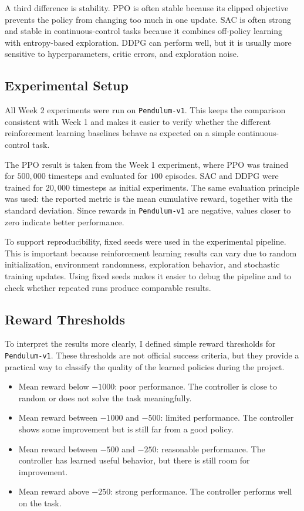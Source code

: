 \documentclass[11pt,a4paper]{article}
\begin{document}
A third difference is stability. PPO is often stable because its clipped objective prevents the policy from changing too much in one update. SAC is often strong and stable in continuous-control tasks because it combines off-policy learning with entropy-based exploration. DDPG can perform well, but it is usually more sensitive to hyperparameters, critic errors, and exploration noise.

\subsection{Experimental Setup}

All Week 2 experiments were run on \texttt{Pendulum-v1}. This keeps the comparison consistent with Week 1 and makes it easier to verify whether the different reinforcement learning baselines behave as expected on a simple continuous-control task.

The PPO result is taken from the Week 1 experiment, where PPO was trained for $500{,}000$ timesteps and evaluated for $100$ episodes. SAC and DDPG were trained for $20{,}000$ timesteps as initial experiments. The same evaluation principle was used: the reported metric is the mean cumulative reward, together with the standard deviation. Since rewards in \texttt{Pendulum-v1} are negative, values closer to zero indicate better performance.

To support reproducibility, fixed seeds were used in the experimental pipeline. This is important because reinforcement learning results can vary due to random initialization, environment randomness, exploration behavior, and stochastic training updates. Using fixed seeds makes it easier to debug the pipeline and to check whether repeated runs produce comparable results.

\subsection{Reward Thresholds}

To interpret the results more clearly, I defined simple reward thresholds for \texttt{Pendulum-v1}. These thresholds are not official success criteria, but they provide a practical way to classify the quality of the learned policies during the project.

\begin{itemize}
    \item Mean reward below $-1000$: poor performance. The controller is close to random or does not solve the task meaningfully.
    \item Mean reward between $-1000$ and $-500$: limited performance. The controller shows some improvement but is still far from a good policy.
    \item Mean reward between $-500$ and $-250$: reasonable performance. The controller has learned useful behavior, but there is still room for improvement.
    \item Mean reward above $-250$: strong performance. The controller performs well on the task.
\end{itemize}
\end{document}
